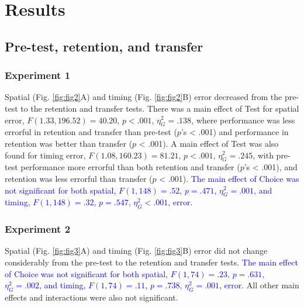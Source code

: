 \documentclass[
  man, donotrepeattitle,floatsintext]{apa7}
\begin{document}
\hypertarget{results}{%
\section{Results}\label{results}}

\hypertarget{pre-test-retention-and-transfer}{%
\subsection{Pre-test, retention, and transfer}\label{pre-test-retention-and-transfer}}

\hypertarget{experiment-1-2}{%
\subsubsection{Experiment 1}\label{experiment-1-2}}

Spatial (Fig. \ref{fig:fig2}A) and timing (Fig. \ref{fig:fig2}B) error decreased from the pre-test to the retention and transfer tests. There was a main effect of Test for spatial error, \(F(1.33,196.52) = 40.20\), \(p < .001\), \(\eta_{G}^2 = .138\), where performance was less errorful in retention and transfer than pre-test (\(p\)'s \textless{} .001) and performance in retention was better than transfer (\(p\) \textless{} .001). A main effect of Test was also found for timing error, \(F(1.08,160.23) = 81.21\), \(p < .001\), \(\eta_{G}^2 = .245\), with pre-test performance more errorful than both retention and transfer (\(p\)'s \textless{} .001), and retention was less errorful than transfer (\(p\) \textless{} .001). \textcolor{blue}{The main effect of Choice was not significant for both spatial, $F(1,148) = .52$, $p = .471$, $\eta_{G}^2 = .001$, and timing, $F(1,148) = .32$, $p = .547$, $\eta_{G}^2 < .001$, error.}

\hypertarget{experiment-2-2}{%
\subsubsection{Experiment 2}\label{experiment-2-2}}

Spatial (Fig. \ref{fig:fig3}A) and timing (Fig. \ref{fig:fig3}B) error did not change considerably from the pre-test to the retention and transfer tests. \textcolor{blue}{The main effect of Choice was not significant for both spatial, $F(1,74) = .23$, $p = .631$, $\eta_{G}^2 = .002$, and timing, $F(1,74) = .11$, $p = .738$, $\eta_{G}^2 = .001$, error.} All other main effects and interactions were also not significant.

\clearpage
\end{document}
